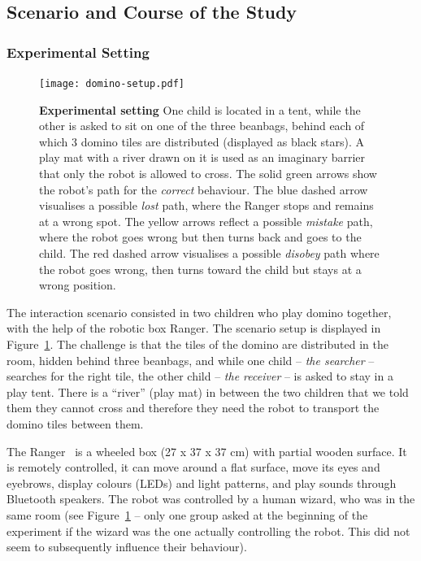 \documentclass{sig-alternate}
\begin{document}
\subsection{Scenario and Course of the Study}

\subsubsection{Experimental Setting}

\begin{figure}[ht!] 
    \centering 
    \texttt{[image: domino-setup.pdf]} 
    \caption{\small \textbf{Experimental setting} One child is located in a
        tent, while the other is asked to sit on one of the three beanbags,
        behind each of which 3 domino tiles are distributed (displayed as black
        stars). A play mat with a river drawn on it is used as an imaginary
        barrier that only the robot is allowed to cross. The solid green arrows
        show the robot's path for the \textit{correct} behaviour. The blue
        dashed arrow visualises a possible \textit{lost} path, where the Ranger
        stops and remains at a wrong spot. The yellow arrows reflect a possible
        \textit{mistake} path, where the robot goes wrong but then turns back
        and goes to the child. The red dashed arrow visualises a possible
        \textit{disobey} path where the robot goes wrong, then turns toward the
        child but stays at a wrong position.} 

    \label{fig:domino-setup} 
\end{figure}


The interaction scenario consisted in two children who play domino together,
with the help of the robotic box Ranger. The scenario setup is displayed in
Figure~\ref{fig:domino-setup}. The challenge is that the tiles of the domino are
distributed in the room, hidden behind three beanbags, and while one child --
\textit{the searcher} -- searches for the right tile, the other child --
\textit{the receiver} -- is asked to stay in a play tent. There is a ``river''
(play mat) in between the two children that we told them they cannot cross
and therefore they need the robot to transport the domino tiles between them.

The Ranger~\cite{mondada2014ranger} is a wheeled box (27 x 37 x 37 cm) with
partial wooden surface. It is remotely controlled, it can move around a flat
surface, move its eyes and eyebrows, display colours (LEDs) and light patterns,
and play sounds through Bluetooth speakers.  The robot was controlled by a human
wizard, who was in the same room (see Figure~\ref{fig:domino-setup} -- only one
group asked at the beginning of the experiment if the wizard was the one
actually controlling the robot. This did not seem to subsequently influence
their behaviour).
\end{document}
